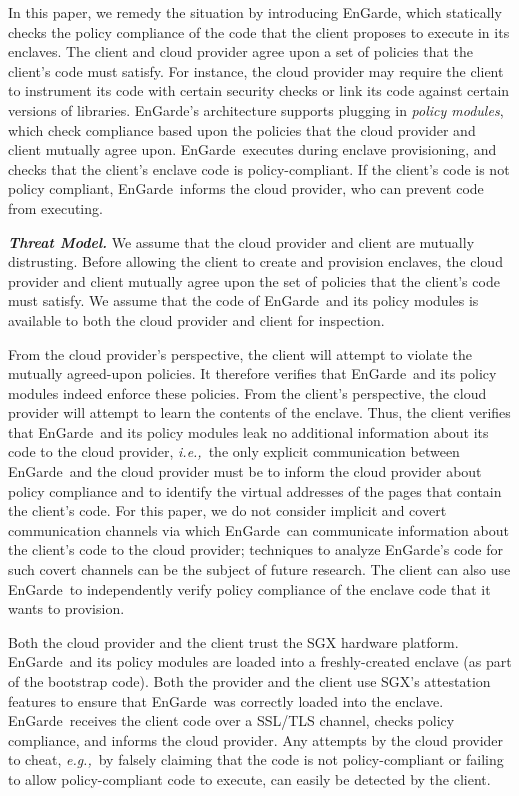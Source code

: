 \documentclass[conference,compsoc]{IEEEtran}
\newcommand{\myparagraph}[1]{\parskip -4pt \indent\par\noindent\textbf{\textit{#1}} \parskip 0pt}
\newcommand{\eg}{\textit{e.g.,}\xspace}
\newcommand{\ie}{\textit{i.e.,}\xspace}
\newcommand{\tool}{EnGarde\xspace} %
\begin{document}
In this paper, we remedy the situation by introducing \tool, which statically
checks the policy compliance of the code that the client proposes to execute in
its enclaves. The client and cloud provider agree upon a set of policies that
the client's code must satisfy. For instance, the cloud provider may require
the client to instrument its code with certain security checks or link its code
against certain versions of libraries. \tool's architecture supports plugging
in \textit{policy modules}, which check compliance based upon the policies that
the cloud provider and client mutually agree upon. \tool\ executes during
enclave provisioning, and checks that the client's enclave code is
policy-compliant. If the client's code is not policy compliant, \tool\ informs
the cloud provider, who can prevent code from executing.

\myparagraph{Threat Model.} 
%
We assume that the cloud provider and client are mutually distrusting. Before
allowing the client to create and provision enclaves, the cloud provider and
client mutually agree upon the set of policies that the client's code must
satisfy. We assume that the code of \tool\ and its policy modules is available
to both the cloud provider and client for inspection. 

From the cloud provider's perspective, the client will attempt to violate the
mutually agreed-upon policies. It therefore verifies that \tool\ and its policy
modules indeed enforce these policies. From the client's perspective, the cloud
provider will attempt to learn the contents of the enclave. Thus, the client
verifies that \tool\ and its policy modules leak no additional information
about its code to the cloud provider, \ie~the only explicit communication
between \tool\ and the cloud provider must be to inform the cloud provider
about policy compliance and to identify the virtual addresses of the pages that
contain the client's code. For this paper, we do not consider implicit and
covert communication channels via which \tool\ can communicate information
about the client's code to the cloud provider; techniques to analyze \tool's
code for such covert channels can be the subject of future research. The client
can also use \tool\ to independently verify policy compliance of the enclave
code that it wants to provision.

Both the cloud provider and the client trust the SGX hardware platform. \tool\
and its policy modules are loaded into a freshly-created enclave (as part of
the bootstrap code). Both the provider and the client use SGX's attestation
features to ensure that \tool\ was correctly loaded into the enclave. \tool\
receives the client code over a SSL/TLS channel, checks policy compliance, and
informs the cloud provider. Any attempts by the cloud provider to cheat, \eg~by
falsely claiming that the code is not policy-compliant or failing to allow
policy-compliant code to execute, can easily be detected by the client.
\end{document}
